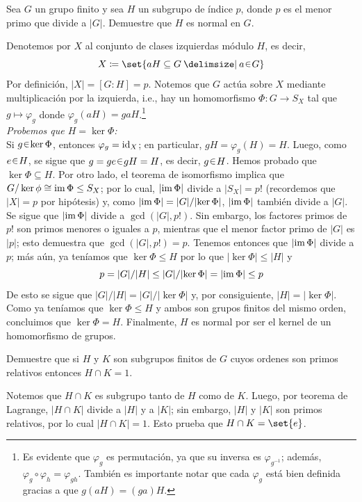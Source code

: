 \begin{ejer}
Sea $G$ un grupo finito y sea $H$ un subgrupo de índice $p$, donde $p$ es el menor primo que divide a $|G|$. Demuestre que $H$ es normal en $G$.
\end{ejer}
\begin{sol}[Demostración]
Denotemos por $X$ al conjunto de clases izquierdas módulo $H$, es decir,
\[
X \coloneq \set{aH \subseteq G \given a \en G}
\]
Por definición, $|X| = [G:H] = p$. Notemos que $G$ actúa sobre $X$ mediante multiplicación por la izquierda, i.e., hay un homomorfismo $\Phi \colon G \to S_X$ tal que $g \mapsto \varphi_g$ donde $\varphi_g(aH) = gaH$.\footnote{Es evidente que $\varphi_g$ es permutación, ya que su inversa es $\varphi_{g^{-1}}$; además, $\varphi_g \circ \varphi_h = \varphi_{gh}$. También es importante notar que cada $\varphi_g$ está bien definida gracias a que $g(aH) = (ga)H$.}\vspace{1em}\\
\emph{Probemos que $H = \ker \Phi
$:}\\
Si $g \en \ker \Phi$, entonces $\varphi_g = \operatorname{id}_X$; en particular, $gH = \varphi_g(H) = H$. Luego, como $e \en H$, se sigue que $g = ge \en gH = H$, es decir, $g \en H$. Hemos probado que $\ker \Phi \subseteq H$. Por otro lado, el teorema de isomorfismo implica que $G/\ker\phi \cong \operatorname{im} \Phi \leq S_X$; por lo cual, $|{\operatorname{im}\Phi}|$ divide a $|S_X| = p!$ (recordemos que $|X| = p$ por hipótesis) y, como $|{\operatorname{im}\Phi}| = |G|/|{\ker\Phi}|$, $|{\operatorname{im}\Phi}|$ también divide a $|G|$. Se sigue que $|{\operatorname{im}\Phi}|$ divide a $\gcd(|G|,p!)$. Sin embargo, los factores primos de $p!$ son primos menores o iguales a $p$, mientras que el menor factor primo de $|G|$ es $|p|$; esto demuestra que $\gcd(|G|,p!) = p$. Tenemos entonces que $|{\operatorname{im}\Phi}|$ divide a $p$; más aún, ya teníamos que $\ker\Phi \leq H$ por lo que $|{\ker\Phi}| \leq |H|$ y 
\[
p = |G|/|H| \leq |G|/|{\ker\Phi}| = |{\operatorname{im}\Phi}| \leq p
\]
De esto se sigue que $|G|/|H| = |G|/|{\ker\Phi}|$ y, por consiguiente, $|H| = |{\ker\Phi}|$. Como ya teníamos que $\ker\Phi \leq H$ y ambos son grupos finitos del mismo orden, concluimos que $\ker\Phi = H$. Finalmente, $H$ es normal por ser el kernel de un homomorfismo de grupos.
\end{sol}

\begin{ejer}
Demuestre que si $H$ y $K$ son subgrupos finitos de $G$ cuyos ordenes son primos relativos entonces $H \cap K = 1$.
\end{ejer}
\begin{sol}[Demostración]
Notemos que $H \cap K$ es subgrupo tanto de $H$ como de $K$. Luego, por teorema de Lagrange, $|H \cap K|$ divide a $|H|$ y a $|K|$; sin embargo, $|H|$ y $|K|$ son primos relativos, por lo cual $|H \cap K| = 1$. Esto prueba que $H \cap K = \set{e}$.
\end{sol}

